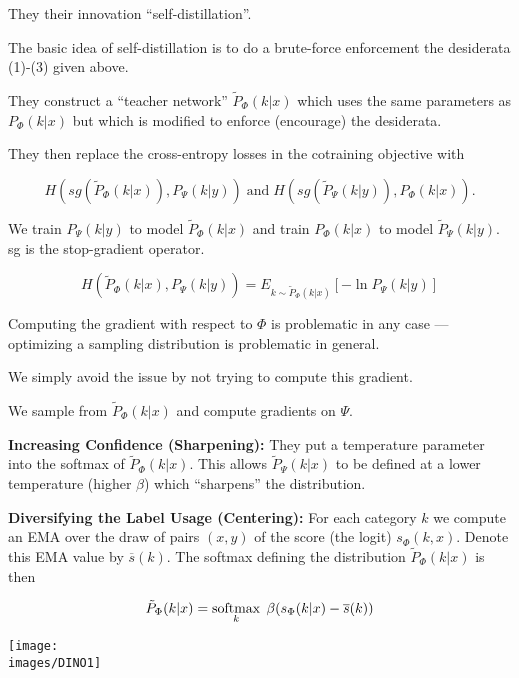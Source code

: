 {{\vfill
They their innovation ``self-distillation''.

\vfill
The basic idea of self-distillation is to do a brute-force enforcement the desiderata (1)-(3) given above.


They construct a ``teacher network'' $\tilde{P}_\Phi(k|x)$ which uses the same parameters as $P_\Phi(k|x)$ but which is modified to enforce
(encourage) the desiderata.

\vfill
They then replace the cross-entropy losses in the cotraining objective with

$$H(sg(\tilde{P}_\Phi(k|x)),P_\Psi(k|y))\;\mbox{and}\;H(sg(\tilde{P}_\Psi(k|y)),P_\Phi(k|x)).$$

\vfill
We train $P_\Psi(k|y)$ to model $\tilde{P}_\Phi(k|x)$
and train $P_\Phi(k|x)$ to model $\tilde{P}_\Psi(k|y)$. sg is the stop-gradient operator.


$$H(\tilde{P}_\Phi(k|x),P_\Psi(k|y)) = E_{k \sim \tilde{P}_\Phi(k|x)}\left[-\ln P_\Psi(k|y)\right]$$

\vfill
Computing the gradient with respect to $\Phi$ is problematic in any case --- optimizing a sampling distribution is problematic in general.

\vfill
We simply avoid the issue by not trying to compute this gradient.

\vfill
We sample from $\tilde{P}_\Phi(k|x)$ and compute gradients on $\Psi$.


\vfill
{\bf Increasing Confidence (Sharpening):} They put a temperature parameter into the softmax of $\tilde{P}_\Phi(k|x)$.
This allows $\tilde{P}_\Psi(k|x)$ to be defined at a lower temperature (higher $\beta$) which ``sharpens'' the distribution.

\vfill
{\bf Diversifying the Label Usage (Centering):} For each category $k$ we compute an EMA over the draw of pairs $(x,y)$ of the
score (the logit) $s_\Phi(k,x)$.  Denote this EMA value by $\overline{s}(k)$.  The softmax defining the distribution $\tilde{P}_\Phi(k|x)$ is then

$$\tilde{P}_\Phi(k|x) = \operatorname*{softmax}_k\;\beta(s_\Phi(k|x) - \overline{s}(k))$$


\centerline{\texttt{[image: \\images/DINO1]}}


}}
